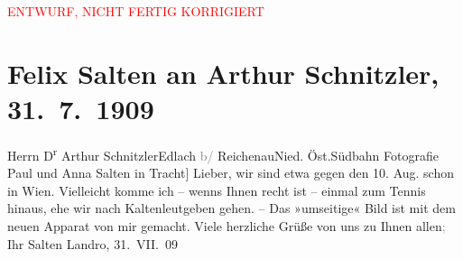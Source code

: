 
\begin{center}
            \textcolor{red}{ENTWURF, NICHT FERTIG KORRIGIERT}
                      \end{center}
            
         
         \renewcommand{\erwaehntePersonen}{Personen: Anna Katharina Rehmann, Paul Salten}
         \renewcommand{\erwaehnteInstitutionen}{Institutionen: Südbahnstrecke}
         \renewcommand{\erwaehnteOrte}{Orte: Edlach, Höhlenstein, Kaltenleutgeben, Niederösterreich, Wien}
         \renewcommand{\erwaehnteWerke}{}
               \section[Felix Salten an Arthur Schnitzler, 31. 7. 1909]{ Felix Salten an Arthur Schnitzler, 31. 7. 1909}\nopagebreak{}\rehead{ }\begin{ledgroupsized}[t]{13cm}\normalsize\beginnumbering \toendnotes[C]{\smallbreak\pagebreak[2]} 
\pstart{}{\pb}Herrn D\textsuperscript{r} Arthur Schnitzler\pend{}\pstart{}Edlach \textcolor{gray}{b/} Reichenau\pend{}\pstart{}Nied. Öst.Südbahn\pend{}{\bigskip}\pstart
           \noindent{}\centering{}{\pb}{[}Fotografie Paul und Anna Salten in
                     Tracht{]}\pend
           \pstart
           Lieber, wir sind etwa gegen den 10. Aug. schon in Wien. Vielleicht komme ich – wenns Ihnen recht ist – einmal zum
               Tennis hinaus, ehe wir nach Kaltenleutgeben
               gehen. – Das »umseitige« Bild ist mit dem neuen Apparat von mir gemacht. Viele
               herzliche Grüße von uns zu Ihnen allen\textcolor{gray}{;}\pend
           \pstart Ihr \spacefill\mbox{Salten}\pend{}\pstart
           Landro, 31. VII. 09\pend
           
         
         \endnumbering{}\end{ledgroupsized}\begin{anhang}\end{anhang}\newcommand{\dateiname}{L03505}\newcommand{\titel}{Felix Salten an Arthur Schnitzler, 31. 7. 1909}\newcommand{\editorInnen}{Martin Anton Müller und Laura Untner}
      